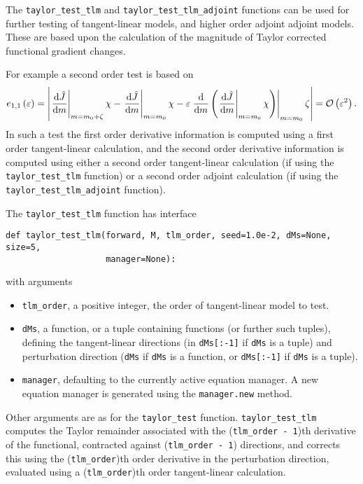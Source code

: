 \documentclass[11pt]{article}
\begin{document}
The \texttt{taylor\_test\_tlm} and \texttt{taylor\_test\_tlm\_adjoint}
functions can be used for further testing of tangent-linear models, and higher
order adjoint adjoint models. These are based upon the calculation of the
magnitude of Taylor corrected functional gradient changes.

For example a second order test is based on
\begin{equation*}
  e_{1,1} \left( \varepsilon \right) = \left|
    \left. \frac{\mathrm{d} \hat{J}}{\mathrm{d} m} \right|_{m = m_0 + \zeta} \chi
    - \left. \frac{\mathrm{d} \hat{J}}{\mathrm{d} m} \right|_{m = m_0} \chi
    - \varepsilon \left. \frac{\mathrm{d}}{\mathrm{d} m} \left( \left. \frac{\mathrm{d} \hat{J}}{\mathrm{d} m} \right|_{m = m_0} \chi \right) \right|_{m = m_0} \zeta
    \right| = {\cal O} \left( \varepsilon^2 \right).
\end{equation*}
In such a test the first order derivative information is computed using a first
order tangent-linear calculation, and the second order derivative information
is computed using either a second order tangent-linear calculation (if using
the \texttt{taylor\_test\_tlm} function) or a second order adjoint calculation
(if using the \texttt{taylor\_test\_tlm\_adjoint} function).

The \texttt{taylor\_test\_tlm} function has interface
\begin{lstlisting}
def taylor_test_tlm(forward, M, tlm_order, seed=1.0e-2, dMs=None, size=5,
                    manager=None):
\end{lstlisting}
with arguments
\begin{itemize}
  \item \texttt{tlm\_order}, a positive integer, the order of tangent-linear
    model to test.
  \item \texttt{dMs}, a function, or a tuple containing functions (or further
    such tuples), defining the tangent-linear directions (in \texttt{dMs[:-1]}
    if \texttt{dMs} is a tuple) and perturbation direction (\texttt{dMs} if
    \texttt{dMs} is a function, or \texttt{dMs[:-1]} if \texttt{dMs} is a
    tuple).
  \item \texttt{manager}, defaulting to the currently active equation manager.
    A new equation manager is generated using the \texttt{manager.new} method.
\end{itemize}
Other arguments are as for the \texttt{taylor\_test} function.
\texttt{taylor\_test\_tlm} computes the Taylor remainder associated with the
(\texttt{tlm\_order - 1})th derivative of the functional, contracted against
(\texttt{tlm\_order - 1}) directions, and corrects this using the
(\texttt{tlm\_order})th order derivative in the perturbation direction,
evaluated using a (\texttt{tlm\_order})th order tangent-linear calculation.
\end{document}
